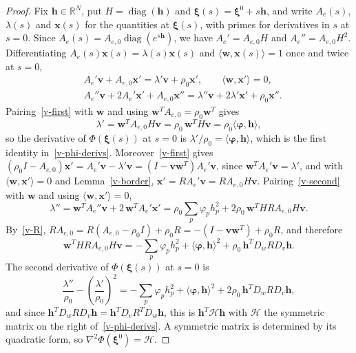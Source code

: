 \documentclass[11pt]{article}
\theoremstyle{plain}
\theoremstyle{remark}
\numberwithin{equation}{section}
\begin{document}
\begin{proof}
Fix $\bm h\in\mathbb{R}^N$, put $H=\operatorname{diag}(\bm h)$ and
$\bm\xi(s)=\bm\xi^0+s\bm h$, and write $A_e(s)$, $\lambda(s)$ and $\bm x(s)$ for
the quantities at $\bm\xi(s)$, with primes for derivatives in $s$ at $s=0$.
Since $A_e(s)=A_{e,0}\operatorname{diag}\left(e^{s\bm h}\right)$, we have $A_e'=A_{e,0}H$ and
$A_e''=A_{e,0}H^2$. Differentiating $A_e(s)\bm x(s)=\lambda(s)\bm x(s)$ and
$\langle\bm w,\bm x(s)\rangle=1$ once and twice at $s=0$,
\begin{align}
&A_e'\bm v+A_{e,0}\bm x'=\lambda'\bm v+\rho_0\bm x',\qquad \langle\bm w,\bm x'\rangle=0,\label{v-first}\\
&A_e''\bm v+2A_e'\bm x'+A_{e,0}\bm x''=\lambda''\bm v+2\lambda'\bm x'+\rho_0\bm x'' .\label{v-second}
\end{align}
Pairing~\eqref{v-first} with $\bm w$ and using $\bm w^TA_{e,0}=\rho_0\bm w^T$ gives
\begin{equation}
\lambda'=\bm w^TA_{e,0}H\bm v=\rho_0\,\bm w^TH\bm v=\rho_0\langle\bm\varphi,\bm h\rangle,
\end{equation}
so the derivative of $\Phi\left(\bm\xi(s)\right)$ at $s=0$ is
$\lambda'/\rho_0=\langle\bm\varphi,\bm h\rangle$, which is the first identity
in~\eqref{v-phi-derivs}. Moreover~\eqref{v-first} gives
$(\rho_0I-A_{e,0})\bm x'=A_e'\bm v-\lambda'\bm v=\left(I-\bm v\bm w^T\right)A_e'\bm v$,
since $\bm w^TA_e'\bm v=\lambda'$, and with $\langle\bm w,\bm x'\rangle=0$ and
Lemma~\ref{v-border}, $\bm x'=RA_e'\bm v=RA_{e,0}H\bm v$. Pairing~\eqref{v-second}
with $\bm w$ and using $\langle\bm w,\bm x'\rangle=0$,
\begin{equation}
\lambda''=\bm w^TA_e''\bm v+2\,\bm w^TA_e'\bm x'
=\rho_0\sum_p\varphi_ph_p^2+2\rho_0\,\bm w^THRA_{e,0}H\bm v .
\end{equation}
By~\eqref{v-R}, $RA_{e,0}=R(A_{e,0}-\rho_0I)+\rho_0R=-\left(I-\bm v\bm w^T\right)+\rho_0R$, and therefore
\begin{equation}
\bm w^THRA_{e,0}H\bm v=-\sum_p\varphi_ph_p^2+\langle\bm\varphi,\bm h\rangle^2
+\rho_0\,\bm h^TD_wRD_v\bm h .
\end{equation}
The second derivative of $\Phi\left(\bm\xi(s)\right)$ at $s=0$ is
\begin{equation}
\frac{\lambda''}{\rho_0}-\left(\frac{\lambda'}{\rho_0}\right)^2
=-\sum_p\varphi_ph_p^2+\langle\bm\varphi,\bm h\rangle^2+2\rho_0\,\bm h^TD_wRD_v\bm h ,
\end{equation}
and since $\bm h^TD_wRD_v\bm h=\bm h^TD_vR^TD_w\bm h$, this is $\bm h^T\mathcal{H}\bm h$
with $\mathcal{H}$ the symmetric matrix on the right of~\eqref{v-phi-derivs}.
A symmetric matrix is determined by its quadratic form, so
$\nabla^2\Phi(\bm\xi^0)=\mathcal{H}$.
\end{proof}
\end{document}
